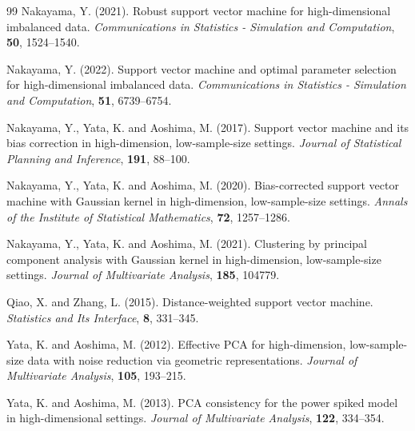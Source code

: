 \documentclass[11pt,a4paper]{amsart}
\numberwithin{equation}{section}
\theoremstyle{definition}
\theoremstyle{remark}
\begin{document}
\begin{thebibliography}{99}
Nakayama, Y. (2021).
Robust support vector machine for high-dimensional imbalanced data.
\textit{Communications in Statistics - Simulation and Computation}, \textbf{50}, 1524--1540.

Nakayama, Y. (2022).
Support vector machine and optimal parameter selection for high-dimensional imbalanced data.
\textit{Communications in Statistics - Simulation and Computation}, \textbf{51}, 6739--6754.

Nakayama, Y., Yata, K. and Aoshima, M. (2017).
Support vector machine and its bias correction in high-dimension, low-sample-size settings.
\textit{Journal of Statistical Planning and Inference}, \textbf{191}, 88--100.

Nakayama, Y., Yata, K. and Aoshima, M. (2020).
Bias-corrected support vector machine with Gaussian kernel in high-dimension, low-sample-size settings.
\textit{Annals of the Institute of Statistical Mathematics}, \textbf{72}, 1257--1286.

Nakayama, Y., Yata, K. and Aoshima, M. (2021).
Clustering by principal component analysis with Gaussian kernel in high-dimension, low-sample-size settings.
\textit{Journal of Multivariate Analysis}, \textbf{185}, 104779.

Qiao, X. and Zhang, L. (2015).
Distance-weighted support vector machine.
\textit{Statistics and Its Interface}, \textbf{8}, 331--345.

Yata, K. and Aoshima, M. (2012).
Effective PCA for high-dimension, low-sample-size data with noise reduction via geometric representations.
\textit{Journal of Multivariate Analysis}, \textbf{105}, 193--215.

Yata, K. and Aoshima, M. (2013).
PCA consistency for the power spiked model in high-dimensional settings.
\textit{Journal of Multivariate Analysis}, \textbf{122}, 334--354.

\end{thebibliography}
\end{document}
